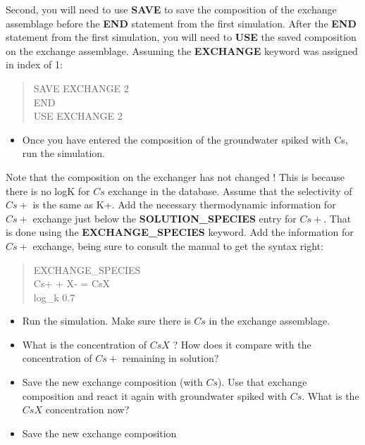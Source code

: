 Second, you will need to use {\color{red}\textbf{SAVE}} to 
save the composition of the exchange assemblage before the 
{\color{red}\textbf{END}} statement from the first simulation.  
After the {\color{red}\textbf{END}} statement from the first simulation, 
you will need to {\color{red}\textbf{USE}} the saved 
composition on the exchange assemblage. 
Assuming the {\color{red}\textbf{EXCHANGE}} keyword was assigned in index of 1:

\begin{quote}
{\color{red}SAVE EXCHANGE 2 \\
END \\
USE EXCHANGE 2 }\\
\end{quote}

\begin{itemize}
\item Once you have entered the composition of the groundwater spiked with Cs, run the simulation.
\end{itemize}

Note that the composition on the exchanger has not changed ! 
This is because there is no logK for $Cs$ exchange in the database.  
Assume that the selectivity of $Cs+$ is the same as K+.  
Add the necessary thermodynamic information for $Cs+$ exchange just below the 
{\color{red}\textbf{SOLUTION\_SPECIES}} entry for $Cs+$. 
That is done using the {\color{red}\textbf{EXCHANGE\_SPECIES}} keyword.  
Add the information for $Cs+$ exchange, being sure to consult the manual to get the syntax right:


\begin{quote}
{\color{red}EXCHANGE\_SPECIES \\
Cs+  +  X-  =  CsX \\
log\_k	0.7 }\\
\end{quote}

\begin{itemize}
\item Run the simulation. Make sure there is $Cs$ in the exchange assemblage.  

\item What is the concentration of $CsX$ ?  
How does it compare with the concentration of $Cs+$ remaining in solution?

\item Save the new exchange composition (with $Cs$). 
Use that exchange composition and react it again with groundwater spiked with $Cs$.  
What is the $CsX$ concentration now? 

\item Save the new exchange composition

\end{itemize}

